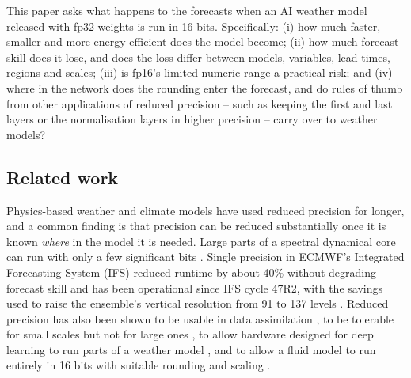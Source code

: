 This paper asks what happens to the forecasts when an AI weather
model released with fp32 weights is run in 16 bits. Specifically: (i)
how much faster, smaller and more energy-efficient does the model
become; (ii) how much forecast skill does it lose, and does the loss
differ between models, variables, lead times, regions and scales; (iii)
is fp16's limited numeric range a practical risk; and (iv) where in the network
does the rounding enter the forecast, and do rules of thumb from other
applications of reduced precision -- such as keeping the first and last
layers or the normalisation layers in higher precision -- carry over to
weather models?

\subsection{Related work}
\label{sec:intro-related-work}

Physics-based weather and climate models have used reduced precision
for longer, and a common finding is that precision can be reduced
substantially once it is known \emph{where} in the model it is
needed. Large parts of a spectral dynamical core can run with
only a few significant bits \citep{dueben2014benchmark}. Single precision
in ECMWF's Integrated Forecasting System (IFS) reduced runtime by about
40\% without degrading forecast skill \citep{vana2017single} and has
been operational since IFS cycle 47R2, with the savings used to raise
the ensemble's vertical resolution from 91 to 137 levels
\citep{lang2021more}. Reduced precision has also been shown to be usable
in data assimilation \citep{hatfield2018improving}, to be tolerable for
small scales but not for large ones \citep{chantry2019scale}, to allow
hardware designed for deep learning to run parts of a weather model
\citep{hatfield2019accelerating}, and to allow a fluid model to run
entirely in 16 bits with suitable rounding and scaling
\citep{klower2022fluid, paxton2022climate}.


